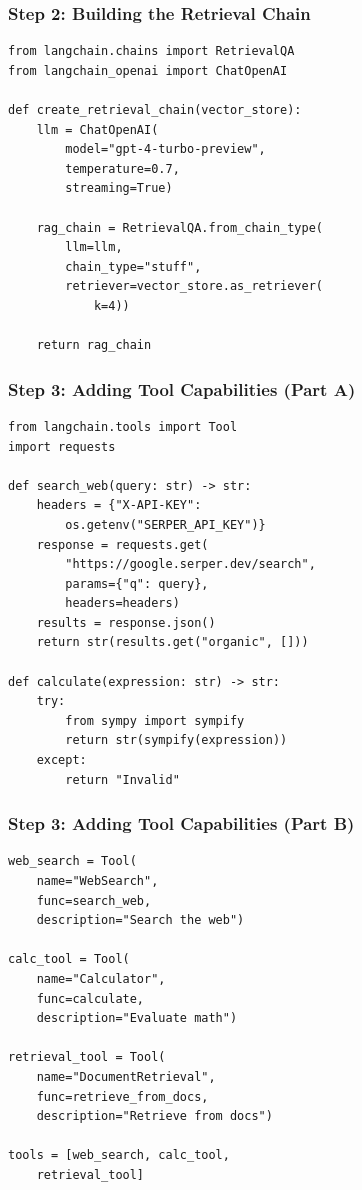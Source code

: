 \documentclass[aspectratio=169,11pt]{beamer}
\begin{document}
\begin{frame}[fragile]
  \frametitle{Step 2: Building the Retrieval Chain}

  \begin{lstlisting}
from langchain.chains import RetrievalQA
from langchain_openai import ChatOpenAI

def create_retrieval_chain(vector_store):
    llm = ChatOpenAI(
        model="gpt-4-turbo-preview",
        temperature=0.7,
        streaming=True)

    rag_chain = RetrievalQA.from_chain_type(
        llm=llm,
        chain_type="stuff",
        retriever=vector_store.as_retriever(
            k=4))

    return rag_chain
  \end{lstlisting}
\end{frame}

\begin{frame}[fragile]
  \frametitle{Step 3: Adding Tool Capabilities (Part A)}

  \begin{lstlisting}
from langchain.tools import Tool
import requests

def search_web(query: str) -> str:
    headers = {"X-API-KEY":
        os.getenv("SERPER_API_KEY")}
    response = requests.get(
        "https://google.serper.dev/search",
        params={"q": query},
        headers=headers)
    results = response.json()
    return str(results.get("organic", []))

def calculate(expression: str) -> str:
    try:
        from sympy import sympify
        return str(sympify(expression))
    except:
        return "Invalid"
  \end{lstlisting}
\end{frame}

\begin{frame}[fragile]
  \frametitle{Step 3: Adding Tool Capabilities (Part B)}

  \begin{lstlisting}
web_search = Tool(
    name="WebSearch",
    func=search_web,
    description="Search the web")

calc_tool = Tool(
    name="Calculator",
    func=calculate,
    description="Evaluate math")

retrieval_tool = Tool(
    name="DocumentRetrieval",
    func=retrieve_from_docs,
    description="Retrieve from docs")

tools = [web_search, calc_tool,
    retrieval_tool]
  \end{lstlisting}
\end{frame}
\end{document}
